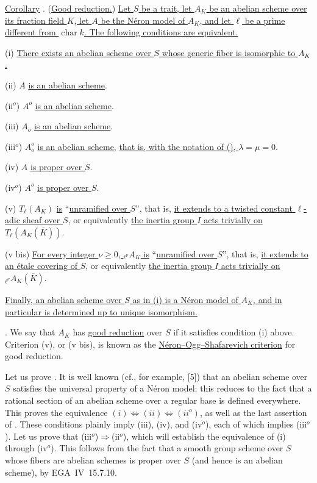 \medskip
\noindent
\underline{Corollary} . (\underline{Good reduction.})
\underline{Let $S$ be a trait, let $A_K$ be an abelian scheme over its
fraction field $K$, let $A$ be the N\'{e}ron model of $A_K$, and let
$\ell$ be a prime different from $\operatorname{char}k$.  The following
conditions are equivalent.}

\smallskip
\noindent
(i) \underline{There exists an abelian scheme over $S$ whose generic
fiber is isomorphic to $A_K$.}

\noindent
(ii) $A$ \underline{is an abelian scheme}.

\noindent
(ii$^o$) $A^o$ \underline{is an abelian scheme}.

\noindent
(iii) $A_o$ \underline{is an abelian scheme}.

\noindent
(iii$^o$) $A_o^o$ \underline{is an abelian scheme}, \underline{that is,
with the notation of (), $\lambda=\mu=0$}.

\noindent
(iv) $A$ \underline{is proper over $S$}.

\noindent
(iv$^o$) $A^o$ \underline{is proper over $S$}.

\noindent
(v) $T_\ell(A_K)$ \underline{is} ``\underline{unramified over $S$}'', that is,
\underline{it extends to a twisted constant $\ell$-adic sheaf over
$S$}, or equivalently \underline{the inertia group $I$ acts trivially
on $T_\ell(A_K(\overline K))$}.

\noindent
(v bis) \underline{For every integer $\nu\geq0$,
${}_{\ell^\nu}A_K$ is} ``\underline{unramified over $S$}'', that is,
\underline{it extends to an \'{e}tale covering of $S$}, or equivalently
\underline{the inertia group $I$ acts trivially on
${}_{\ell^\nu}A_K(\overline K)$}.

\smallskip
\noindent
\underline{Finally, an abelian scheme over $S$ as in (i) is a N\'{e}ron
model of $A_K$, and in particular is determined up to unique
isomorphism.}

\medskip
\noindent
{}. We say that $A_K$ has \underline{good reduction} over $S$ if
it satisfies condition (i) above.  Criterion (v), or (v bis), is known
as the \underline{N\'{e}ron--Ogg--Shafarevich criterion} for good
reduction.

Let us prove .  It is well known (cf., for example, [5]) that an
abelian scheme over $S$ satisfies the universal property of a
N\'{e}ron model; this reduces to the fact that a rational section of an
abelian scheme over a regular base is defined everywhere.  This proves
the equivalence
$(i)\Longleftrightarrow(ii)\Longleftrightarrow(ii^o)$, as well as the
last assertion of .  These conditions plainly imply (iii), (iv),
and (iv$^o$), each of which implies (iii$^o$).  Let us prove that
(iii$^o$)$\Longrightarrow$(ii$^o$), which will establish the
equivalence of (i) through (iv$^o$).  This follows from the fact that a
smooth group scheme over $S$ whose fibers are abelian schemes is proper
over $S$ (and hence is an abelian scheme), by EGA~IV~15.7.10.

